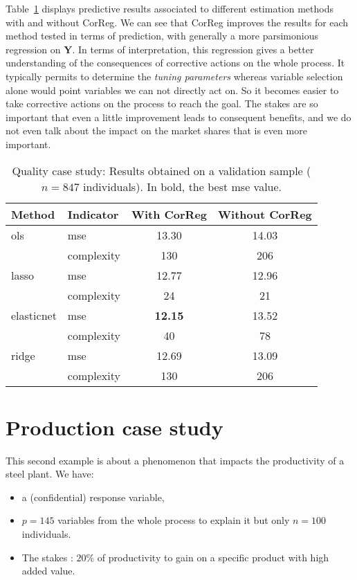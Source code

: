 \documentclass[12pt,a4paper]{report}
\begin{document}
\vspace{3mm}
	
	
Table~\ref{Res_exfos} displays predictive results associated to different estimation methods with and without {\sc CorReg}. We can see that {\sc CorReg} improves the results for each method tested in terms of prediction, with generally a more parsimonious regression on $\boldsymbol{Y}$. In terms of interpretation, this regression gives a better understanding of the consequences of corrective actions on the whole process. It typically permits to determine the \textit{tuning parameters} whereas variable selection alone would point variables we can not directly act on.	So it becomes easier to take corrective actions on the process to reach the goal. The stakes are so important that even a little improvement leads to consequent benefits, and we do not even talk about the impact on the market shares that is even more important.
		

		\begin{table}[h!]
\centering
\begin{tabular}{llcc}
	\hline
	Method& Indicator& With {\sc CorReg} & Without {\sc CorReg} \\ 
	\hline \hline
	{\sc ols} & {\sc mse} & 13.30 & 14.03 \\
		& complexity& 130 & 206 \\
	\hline
	{\sc lasso} & {\sc mse} & 12.77 & 12.96 \\
		& complexity& 24 & 21 \\
	\hline
	elasticnet & {\sc mse} & \textbf{12.15} & 13.52 \\
		& complexity& 40 & 78 \\
	\hline
	ridge & {\sc mse} & 12.69 & 13.09 \\
		& complexity& 130 & 206 \\
	\hline
\end{tabular} 
\caption{Quality case study: Results obtained on a validation sample ($n=847$ individuals). In bold, the best {\sc mse} value.}\label{Res_exfos}
\end{table}


		\FloatBarrier
		\section{Production case study}\label{sectionBV}
This second example is about a phenomenon that impacts the productivity of a steel plant.
We have:
		\begin{itemize}
			\item a (confidential)  response variable,
			\item $p=145$ variables from the whole process to explain it but only $n=100$ individuals.
			\item The stakes : $20\%$ of productivity to gain on a specific product with high added value.
		\end{itemize}
		
\end{document}
